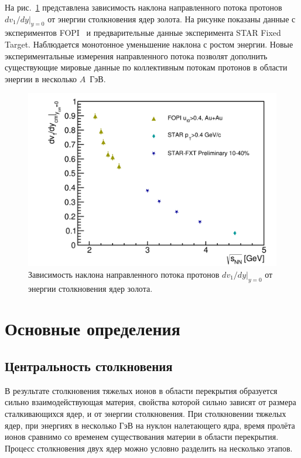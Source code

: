 На рис.~\ref{fig:dv1dy_energy} представлена зависимость наклона направленного потока протонов $dv_1/dy|_{y=0}$ от энергии столкновения ядер золота.
На рисунке показаны данные с экспериментов FOPI~\cite{FOPI:2011aa} и предварительные данные эксперимента STAR Fixed Target.
Наблюдается монотонное уменьшение наклона с ростом энергии.
Новые экспериментальные измерения направленного потока позволят дополнить существующие мировые данные по коллективным потокам протонов в области энергии в несколько $A$~ГэВ.
%
\begin{figure}
    \centering
    \includegraphics[width=0.5\linewidth]{images/dv1dy_sqrt_snn.png}
    \caption{Зависимость наклона направленного потока протонов $dv_1/dy|_{y=0}$ от энергии столкновения ядер золота.}
    \label{fig:dv1dy_energy}
\end{figure}

\section{Основные определения}

\subsection{Центральность столкновения}

В результате столкновения тяжелых ионов в области перекрытия образуется сильно взаимодействующая материя, свойства которой сильно зависят от размера сталкивающихся ядер, и от энергии столкновения.
При столкновении тяжелых ядер, при энергиях в несколько ГэВ на нуклон налетающего ядра, время пролёта ионов сравнимо со временем существования материи в области перекрытия.
Процесс столкновения двух ядер можно условно разделить на несколько этапов.

